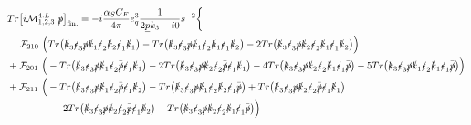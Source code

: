 \documentclass[aps,prd,superscriptaddress,floatfix,showpacs]{revtex4}
\begin{document}
\begin{equation}\label{eq-finite-4L}
\begin{aligned}
&Tr\big[ i\mathcal{M}^{4.L}_{1,2,3} ~\slashed{p} \big]_{\mathrm{fin.}} = -i \frac{\alpha_SC_F}{4\pi} e_q^3  \frac{1}{2\underline{p}k_3 - i0} s^{-2} \bigg\{ \\
&\phantom{Aa}\mathcal{F}_{210}~ \Big( Tr\big( \slashed{k}_3 \slashed{\epsilon}_3 \slashed{p} \slashed{k}_1 \slashed{\epsilon}_2 \slashed{k}_2 \slashed{\epsilon}_1 \slashed{k}_1 \big) - Tr\big( \slashed{k}_3 \slashed{\epsilon}_3 \slashed{p} \slashed{k}_1 \slashed{\epsilon}_2 \slashed{k}_1 \slashed{\epsilon}_1 \slashed{k}_2 \big) -2Tr\big( \slashed{k}_3 \slashed{\epsilon}_3 \slashed{p} \slashed{k}_2 \slashed{\epsilon}_2 \slashed{k}_1 \slashed{\epsilon}_1 \slashed{k}_2 \big) \Big)\\
&+\mathcal{F}_{201}~ \Big( - Tr\big( \slashed{k}_3 \slashed{\epsilon}_3 \slashed{p} \slashed{k}_1 \slashed{\epsilon}_2 \bar{\slashed{p}} \slashed{\epsilon}_1 \slashed{k}_1 \big) -2Tr\big( \slashed{k}_3 \slashed{\epsilon}_3 \slashed{p} \slashed{k}_2 \slashed{\epsilon}_2 \bar{\slashed{p}} \slashed{\epsilon}_1 \slashed{k}_1 \big) 
- 4 Tr\big( \slashed{k}_3 \slashed{\epsilon}_3 \slashed{p} \slashed{k}_2 \slashed{\epsilon}_2 \slashed{k}_1 \slashed{\epsilon}_1 \bar{\slashed{p}} \big) - 5 Tr\big( \slashed{k}_3 \slashed{\epsilon}_3 \slashed{p} \slashed{k}_1 \slashed{\epsilon}_2 \slashed{k}_1 \slashed{\epsilon}_1 \bar{\slashed{p}} \big) \Big)\\
&+\mathcal{F}_{211}~\Big( -Tr\big( \slashed{k}_3 \slashed{\epsilon}_3 \slashed{p} \slashed{k}_1 \slashed{\epsilon}_2 \bar{\slashed{p}} \slashed{\epsilon}_1 \slashed{k}_2 \big) - Tr\big( \slashed{k}_3 \slashed{\epsilon}_3 \slashed{p} \slashed{k}_1\slashed{\epsilon}_2 \slashed{k}_2 \slashed{\epsilon}_1 \bar{\slashed{p}} \big) 
+ Tr\big( \slashed{k}_3 \slashed{\epsilon}_3 \slashed{p} \slashed{k}_2 \slashed{\epsilon}_2 \bar{\slashed{p}} \slashed{\epsilon}_1 \slashed{k}_1 \big) 
\\
&\phantom{AAAAAA}-2 Tr\big( \slashed{k}_3 \slashed{\epsilon}_3 \slashed{p} \slashed{k}_2 \slashed{\epsilon}_2 \bar{\slashed{p}} \slashed{\epsilon}_1 \slashed{k}_2 \big) -  Tr\big( \slashed{k}_3 \slashed{\epsilon}_3 \slashed{p} \slashed{k}_2 \slashed{\epsilon}_2 \slashed{k}_1 \slashed{\epsilon}_1 \bar{\slashed{p}} \big) \Big) \\

\end{aligned}
\end{equation}
\end{document}

